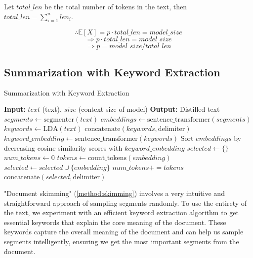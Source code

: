Let $total\_len$ be the total number of tokens in the text, then $total\_len = \sum_{i = 1}^{n} len_i$.

\[ \therefore \mathbb{E}[X] = p \cdot total\_len = model\_size \]
\[ \Rightarrow p \cdot total\_len = model\_size \]
\[ \Rightarrow p = model\_size / total\_len \]


\subsection{Summarization with Keyword Extraction}
\label{method:keyword}

\begin{algorithm*}
  \caption{Summarization with Keyword Extraction}

  \begin{algorithmic}
    \State \textbf{Input:} $text$ (text), $size$ (context size of model)
    \State \textbf{Output:} Distilled text
    \State $segments \leftarrow \text{segmenter}(text)$
    \State $embeddings \leftarrow \text{sentence\_transformer}(segments)$
    \State $keywords \leftarrow \text{LDA}(text)$
    \State $\text{concatenate}(keywords, \text{delimiter})$
    \State $keyword\_embedding \leftarrow \text{sentence\_transformer}(keywords)$
    \State Sort $embeddings$ by decreasing cosine similarity scores with $keyword\_embedding$
    \State $selected \leftarrow \{\}$
    \State $num\_tokens \leftarrow 0$
      \State $tokens \leftarrow \text{count\_tokens}(embedding)$
        \State $selected \leftarrow selected \cup \{embedding\}$
        \State $num\_tokens += tokens$
      \EndIf
    \EndFor
    \State $\text{concatenate}(selected, \text{delimiter})$
    \State {}
  \end{algorithmic}

  \label{algo:keyword}
\end{algorithm*}

"Document skimming" (\autoref{method:skimming}) involves a very intuitive and straightforward approach of sampling segments randomly.
To use the entirety of the text, we experiment with an efficient keyword extraction algorithm to get essential keywords that explain the core meaning of the document.
These keywords capture the overall meaning of the document and can help us sample segments intelligently, ensuring we get the most important segments from the document.

